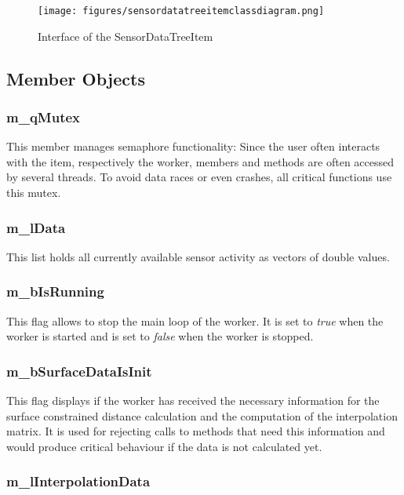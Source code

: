 \begin{figure}[h]
	\begin{center}
		\texttt{[image: figures/sensordatatreeitemclassdiagram.png]}
		\caption{Interface of the SensorDataTreeItem}
	\end{center}
\end{figure}

\subsection{Member Objects}

\subsubsection{m\_qMutex}

This member manages semaphore functionality: Since the user often interacts with the item, respectively the worker, members and methods are often accessed by several threads. To avoid data races or even crashes, all critical functions use this mutex.

\subsubsection{m\_lData}

This list holds all currently available sensor activity as vectors of double values.

\subsubsection{m\_bIsRunning}

This flag allows to stop the main loop of the worker. It is set to \textit{true} when the worker is started and is set to \textit{false} when the worker is stopped.

\subsubsection{m\_bSurfaceDataIsInit}

This flag displays if the worker has received the necessary information for the surface constrained distance calculation and the computation of the interpolation matrix. It is used for rejecting calls to methods that need this information and would produce critical behaviour if the data is not calculated yet.

\subsubsection{m\_lInterpolationData}

